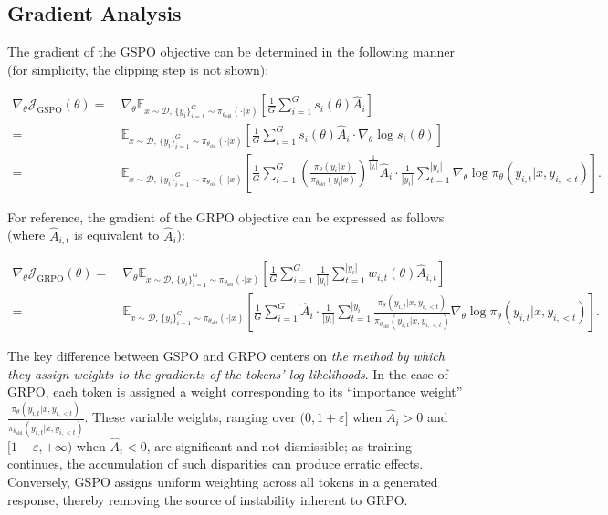 \subsection{Gradient Analysis}
\label{subsec:gradient}

The gradient of the GSPO objective can be determined in the following manner (for simplicity, the clipping step is not shown):

\begin{align}
\nabla_{\theta} \mathcal{J}_\text{GSPO} (\theta)
=&\ 
\nabla_{\theta} \mathbb{E}_{ x \sim \mathcal{D},\, \{y_i\}_{i=1}^G \sim \pi_{\theta_\text{old}}( \cdot | x) }
\left[ 
\frac{1}{G} \sum_{i=1}^{G} s_{i}(\theta) \widehat{A}_{i}
\right] \\
= &\ 
\mathbb{E}_{ x \sim \mathcal{D},\, \{y_i\}_{i=1}^G \sim \pi_{\theta_\text{old}}( \cdot | x) }
\left[ 
\frac{1}{G} \sum_{i=1}^{G}
s_{i}(\theta) \widehat{A}_{i}
\cdot \nabla_{\theta} \log s_{i}(\theta)
\right] \\
=&\ 
\mathbb{E}_{ x \sim \mathcal{D},\, \{y_i\}_{i=1}^G \sim \pi_{\theta_\text{old}}( \cdot | x) }
\left[ 
\frac{1}{G} \sum_{i=1}^{G} 
\left( \frac{ \pi_{\theta} (y_i | x) }{ \pi_{\theta_\text{old}} (y_i | x)} \right)^{\frac{1}{|y_i|}} \widehat{A}_{i} 
\cdot \frac{1}{|y_i|} \sum_{t=1}^{|y_i|} \nabla_{\theta} \log \pi_{\theta} (y_{i,t} | x, y_{i,<t}) 
\right].
\label{equ:gspo_grad}
\end{align}

For reference, the gradient of the GRPO objective can be expressed as follows (where $\widehat{A}_{i,t}$ is equivalent to $\widehat{A}_{i}$):

\begin{align}
\nabla_{\theta} \mathcal{J}_\text{GRPO} (\theta) 
=&\ 
\nabla_{\theta} \mathbb{E}_{ x \sim \mathcal{D},\, \{y_i\}_{i=1}^G \sim \pi_{\theta_\text{old}}( \cdot | x) }
\left[ \frac{1}{G} \sum_{i=1}^{G} \frac{1}{|y_i|} \sum_{t=1}^{|y_i|} 
w_{i,t}(\theta) \widehat{A}_{i,t}
\right] \\
=&\
\mathbb{E}_{ x \sim \mathcal{D},\, \{y_i\}_{i=1}^G \sim \pi_{\theta_\text{old}}( \cdot | x) }
\left[ \frac{1}{G} \sum_{i=1}^{G} \widehat{A}_{i} 
\cdot \frac{1}{|y_i|} \sum_{t=1}^{|y_i|} 
\frac{ \pi_{\theta} (y_{i,t} | x, y_{i,<t}) }{ \pi_{\theta_\text{old}} (y_{i,t} | x,y_{i,<t})} 
\nabla_{\theta} \log \pi_{\theta} (y_{i,t} | x, y_{i,<t})  
\right].
\end{align}

The key difference between GSPO and GRPO centers on \textit{the method by which they assign weights to the gradients of the tokens’ log likelihoods}. In the case of GRPO, each token is assigned a weight corresponding to its ``importance weight'' $\frac{ \pi_{\theta} (y_{i,t} | x, y_{i,<t}) }{ \pi_{\theta_\text{old}} (y_{i,t} | x,y_{i,<t})}$. These variable weights, ranging over $(0, 1+\varepsilon]$ when $\widehat{A}_{i} >0$ and $[1-\varepsilon, +\infty)$ when $\widehat{A}_{i} < 0$, are significant and not dismissible; as training continues, the accumulation of such disparities can produce erratic effects. Conversely, GSPO assigns uniform weighting across all tokens in a generated response, thereby removing the source of instability inherent to GRPO.

